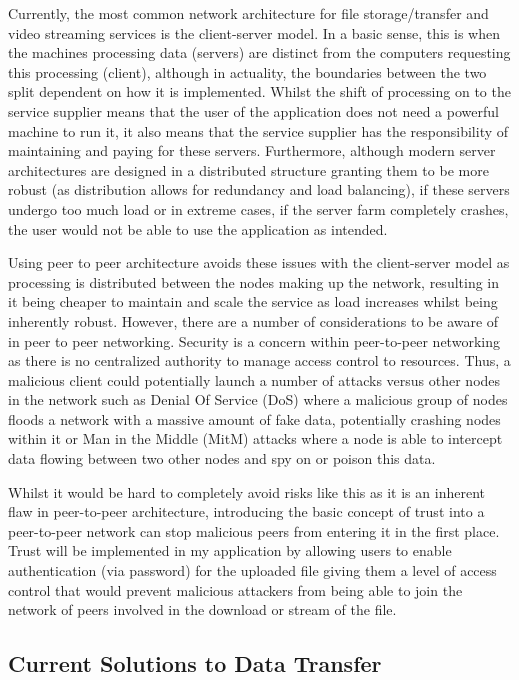 \documentclass[]{report}
\begin{document}
			Currently, the most common network architecture for file storage/transfer and video streaming services is the client-server model. In a basic sense, this is when the machines processing data (servers) are distinct from the computers requesting this processing (client), although in actuality, the boundaries between the two split dependent on how it is implemented. Whilst the shift of processing on to the service supplier means that the user of the application does not need a powerful machine to run it, it also means that the service supplier has the responsibility of maintaining and paying for these servers. Furthermore, although modern server architectures are designed in a distributed structure granting them to be more robust (as distribution allows for redundancy and load balancing), if these servers undergo too much load or in extreme cases, if the server farm completely crashes, the user would not be able to use the application as intended.
			
			Using peer to peer architecture avoids these issues with the client-server model as processing is distributed between the nodes making up the network, resulting in it being cheaper to maintain and scale the service as load increases whilst being inherently robust. However, there are a number of considerations to be aware of in peer to peer networking. Security is a concern within peer-to-peer networking as there is no centralized authority to manage access control to resources. Thus, a malicious client could potentially launch a number of attacks versus other nodes in the network such as Denial Of Service (DoS) where a malicious group of nodes floods a network with a massive amount of fake data, potentially crashing nodes within it or Man in the Middle (MitM) attacks where a node is able to intercept data flowing between two other nodes and spy on or poison this data.\cite{P2P Security Issues}
			
			Whilst it would be hard to completely avoid risks like this as it is an inherent flaw in peer-to-peer architecture, introducing the basic concept of trust into a peer-to-peer network can stop malicious peers from entering it in the first place. Trust will be implemented in my application by allowing users to enable authentication (via password) for the uploaded file giving them a level of access control that would prevent malicious attackers from being able to join the network of peers involved in the download or stream of the file. 
	
		\subsection*{Current Solutions to Data Transfer}
			
\end{document}
